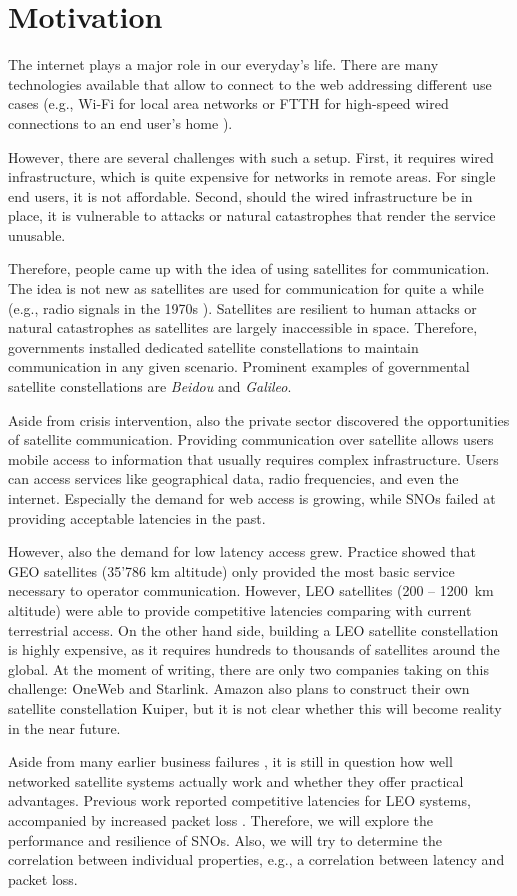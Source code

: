 \section{Motivation} \label{sec:motivation}

The internet plays a major role in our everyday's life. There are many
technologies available that allow to connect to the web addressing different
use cases (e.g., Wi-Fi for local area networks \cite{Henry2002} or \ac{FTTH}
for high-speed wired connections to an end user's home \cite{Aleksic2010}).

However, there are several challenges with such a setup. First, it requires
wired infrastructure, which is quite expensive for networks in remote areas.
For single end users, it is not affordable. Second, should the wired infrastructure be in place, it is vulnerable to attacks or natural catastrophes that render the service unusable.

Therefore, people came up with the idea of using satellites for communication.
The idea is not new as satellites are used for communication for quite a while
(e.g., radio signals in the 1970s \cite{Davies1980}). Satellites are resilient
to human attacks or natural catastrophes as satellites are largely inaccessible
in space. Therefore, governments installed dedicated satellite constellations
to maintain communication in any given scenario. Prominent examples of
governmental satellite constellations are \textit{Beidou} and \textit{Galileo}.

Aside from crisis intervention, also the private sector discovered the
opportunities of satellite communication. Providing communication over
satellite allows users mobile access to information that usually requires
complex infrastructure. Users can access services like geographical data, radio
frequencies, and even the internet. Especially the demand for web access is
growing, while \ac{SNO}s failed at providing acceptable latencies in the past.

However, also the demand for low latency access grew. Practice showed that
\ac{GEO} satellites (35'786 km altitude) only provided the most basic service
necessary to operator communication. However, \ac{LEO} satellites (200 --
1200~km altitude) were able to provide competitive latencies comparing with
current terrestrial access. On the other hand side, building a \ac{LEO}
satellite constellation is highly expensive, as it requires hundreds to
thousands of satellites around the global. At the moment of writing, there are
only two companies taking on this challenge: OneWeb and Starlink. Amazon also
plans to construct their own satellite constellation Kuiper, but it is not
clear whether this will become reality in the near future.

Aside from many earlier business failures \cite{Chan2002, Barboza2000}, it is
still in question how well networked satellite systems actually work and
whether they offer practical advantages. Previous work reported competitive
latencies for \ac{LEO} systems, accompanied by increased packet loss
\cite{DBLP:conf/imc/MichelTGB22}. Therefore, we will explore the performance
and resilience of \ac{SNO}s. Also, we will try to determine the correlation
between individual properties, e.g., a correlation between latency and packet
loss.
